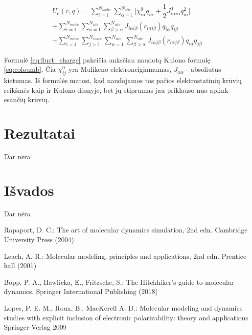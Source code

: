 \documentclass[runningheads]{llncs}
\begin{document}
\begin{multline} \label{eq:fluct_charge}
    U_{e}(r, q) = \sum\limits_{i=1}^{N_{molec}} \sum\limits_{\alpha=1}^{N_{site}}
        {\bigg[\chi_{i\alpha}^0 q_{i\alpha} + \dfrac{1} {2} J_{i\alpha i\alpha}^0 q_{i\alpha}^2 \bigg]} \\
    + \sum\limits_{i=1}^{N_{molec}} \sum\limits_{\alpha=1}^{N_{site}} \sum\limits_{\beta>\alpha}^{N_{site}}
        {J_{i\alpha i\beta} (r_{i\alpha i\beta}) q_{i\alpha} q_{i\beta}} \\
    + \sum\limits_{i=1}^{N_{molec}} \sum\limits_{j>i}^{N_{molec}} \sum\limits_{\alpha=1}^{N_{site}} \sum\limits_{\beta>\alpha}^{N_{site}}
        {J_{i\alpha j\beta} (r_{i\alpha j\beta}) q_{i\alpha} q_{j\beta}}
\end{multline}

Formulė \ref{eq:fluct_charge} pakeičia anksčiau naudotą Kulono formulę \ref{eq:coloumb}.
Čia \(\chi_{ij}^0\) yra Mulikeno elektroneigiamumas, \(J_{\alpha\alpha}\) - absoliutus kietumas.
Iš formulės matosi, kad naudojamos tos pačios elektrostatinių krūvių reikšmės kaip ir Kulono dėsnyje,
bet jų stiprumas jau priklauso nuo aplink esančių krūvių.

\section{Rezultatai}

Dar nėra

\section{Išvados}

Dar nėra

%
%
%
% 
% 
%
\begin{thebibliography}{8}
    Rapaport, D. C.: The art of molecular dynamics simulation, 2nd edn. Cambridge University Press (2004)

    Leach, A. R.: Molecular modeling, principles and applications, 2nd edn. Prentice hall (2001)

    Bopp, P. A., Hawlicka, E., Fritzsche, S.: The Hitchhiker’s guide to molecular dynamics. Springer International Publishing (2018)

    Lopes, P. E. M., Roux, B., MacKerell A. D.:
    Molecular modeling and dynamics studies with explicit inclusion of electronic polarizability: theory and applications Springer-Verlag 2009
\end{thebibliography}
\end{document}

